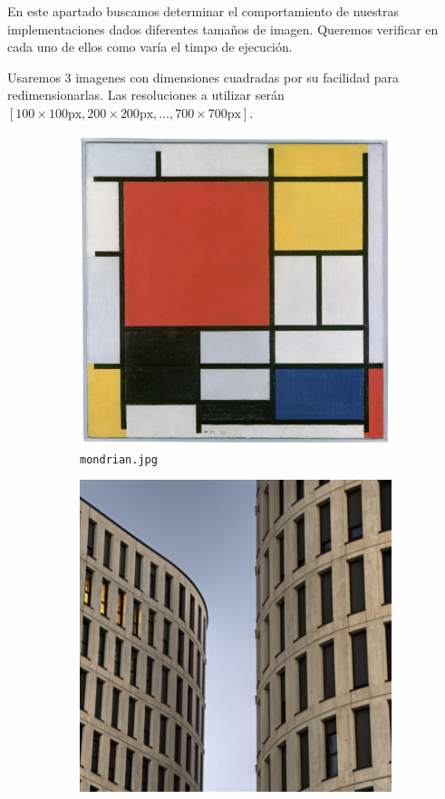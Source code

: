 En este apartado buscamos determinar el comportamiento de nuestras
implementaciones dados diferentes tamaños de imagen. Queremos verificar en cada
uno de ellos como varía el timpo de ejecución. 

Usaremos 3 imagenes con dimensiones cuadradas por su facilidad para
redimensionarlas. Las resoluciones a utilizar serán $[100 \times
100\text{px},200 \times 200\text{px}, \dots, 700 \times 700\text{px}]$.

\begin{figure}[H]
	\centering
	\begin{subfigure}{0.3\linewidth}
		\includegraphics[width=\linewidth]{segmentation/entradas-posta/mondrian}
		\caption{\texttt{mondrian.jpg}}
	\end{subfigure}
	\begin{subfigure}{0.3\linewidth}
		\includegraphics[width=\linewidth]{segmentation/entradas-posta/edificios}

\end{subfigure}
\end{figure}
